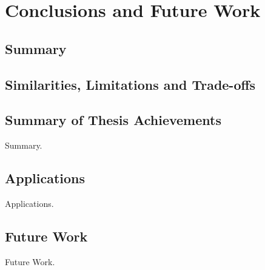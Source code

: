 \chapter{Conclusions and Future Work}

\label{ch:conclusions}

\section{Summary} %
\label{sec:summary}


\section{Similarities, Limitations and Trade-offs} %
\label{sec:similarities_limitations_and_trade_offs}

\section{Summary of Thesis Achievements}

Summary.


\section{Applications}

Applications.


\section{Future Work}

Future Work.